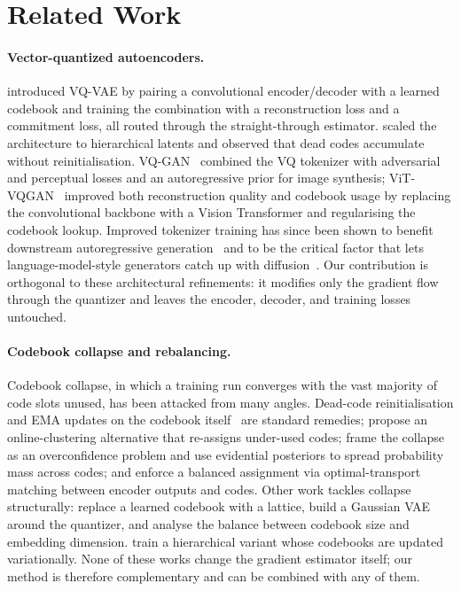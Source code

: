 \section{Related Work}
\label{sec:related_work}

\paragraph{Vector-quantized autoencoders.}
\citet{vandenoord2017vqvae} introduced VQ-VAE by pairing a
convolutional encoder/decoder with a learned codebook and training
the combination with a reconstruction loss and a commitment loss, all
routed through the straight-through estimator.
\citet{razavi2019vqvae2} scaled the architecture to hierarchical
latents and observed that dead codes accumulate without
reinitialisation. VQ-GAN~\citep{esser2021vqgan} combined the VQ
tokenizer with adversarial and perceptual losses and an autoregressive
prior for image synthesis; ViT-VQGAN~\citep{yu2022vitvqgan} improved
both reconstruction quality and codebook usage by replacing the
convolutional backbone with a Vision Transformer and regularising the
codebook lookup. Improved tokenizer training has since been shown to
benefit downstream autoregressive
generation~\citep{sun2024llamagen,yu2024titok,chang2022maskgit} and to
be the critical factor that lets language-model-style generators catch
up with diffusion~\citep{yu2023magvit2}. Our contribution is
orthogonal to these architectural refinements: it modifies only the
gradient flow through the quantizer and leaves the encoder,
decoder, and training losses untouched.

\paragraph{Codebook collapse and rebalancing.}
Codebook collapse, in which a training run converges with the vast
majority of code slots unused, has been attacked from many
angles. Dead-code reinitialisation and EMA updates on the codebook
itself~\citep{vandenoord2017vqvae,razavi2019vqvae2} are standard
remedies; \citet{zheng2023onlineclustered} propose an online-clustering
alternative that re-assigns under-used codes; \citet{baykal2023edvae}
frame the collapse as an overconfidence problem and use evidential
posteriors to spread probability mass across codes; and
\citet{zhang2024optimaltransportvq} enforce a balanced assignment via
optimal-transport matching between encoder outputs and codes. Other
work tackles collapse structurally: \citet{khalil2023llvqvae} replace
a learned codebook with a lattice, \citet{xu2025gaussianvq} build a
Gaussian VAE around the quantizer, and \citet{chen2024vqdimbalance}
analyse the balance between codebook size and embedding dimension.
\citet{takida2024hqvae} train a hierarchical variant whose codebooks
are updated variationally. None of these works change the gradient
estimator itself; our method is therefore complementary and can be
combined with any of them.

